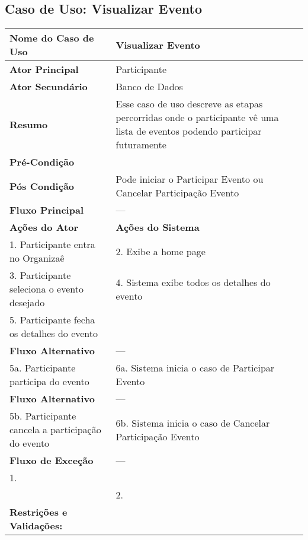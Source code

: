 \documentclass[12pt,a4paper]{article}
\begin{document}
\subsection{Caso de Uso: Visualizar Evento}
\begin{longtable}{|p{4cm}|p{11cm}|}
\hline
\textbf{Nome do Caso de Uso} & Visualizar Evento \\ \hline
\textbf{Ator Principal} & Participante \\ \hline
\textbf{Ator Secundário} & Banco de Dados \\ \hline
\textbf{Resumo} & Esse caso de uso descreve as etapas percorridas onde o participante vê uma lista de eventos podendo participar futuramente \\ \hline
\textbf{Pré-Condição} & \\ \hline
\textbf{Pós Condição} & Pode iniciar o Participar Evento ou Cancelar Participação Evento \\ \hline
\textbf{Fluxo Principal} & --- \\ \hline
\textbf{Ações do Ator} & \textbf{Ações do Sistema} \\ \hline
1. Participante entra no Organizaê & 2. Exibe a home page \\ \hline
3. Participante seleciona o evento desejado & 4. Sistema exibe todos os detalhes do evento \\ \hline
5. Participante fecha os detalhes do evento & \\ \hline
\textbf{Fluxo Alternativo} & --- \\ \hline
5a. Participante participa do evento & 6a. Sistema inicia o caso de Participar Evento \\ \hline
\textbf{Fluxo Alternativo} & --- \\ \hline
5b. Participante cancela a participação do evento & 6b. Sistema inicia o caso de Cancelar Participação Evento \\ \hline
\textbf{Fluxo de Exceção} & --- \\ \hline
1. & \\ \hline
& 2. \\ \hline
\textbf{Restrições e Validações:} & \\ \hline
\end{longtable}

\vspace{1cm}

\newpage
\end{document}
